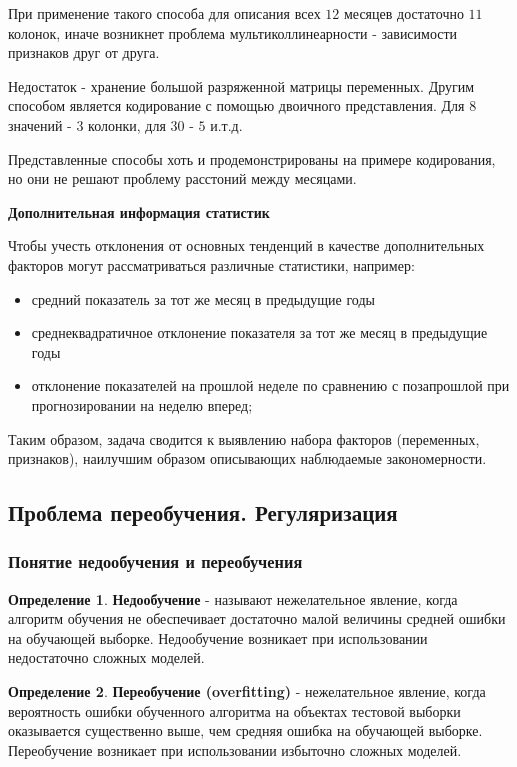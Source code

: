 \documentclass[aps,%
12pt,%
final,%
oneside,
onecolumn,%
musixtex, %
superscriptaddress,%
centertags]{article} %
\theoremstyle{plain}
\theoremstyle{definition}
\newtheorem{definition}{Определение}[subsection]
\theoremstyle{remark}
\begin{document}
При применение такого способа для описания всех $12$ месяцев достаточно $11$ колонок, иначе возникнет проблема мультиколлинеарности - зависимости признаков друг от друга.

Недостаток - хранение большой разряженной матрицы переменных. Другим способом является кодирование с помощью двоичного представления. Для $8$ значений - $3$ колонки, для $30$ - $5$ и.т.д.

Представленные способы хоть и продемонстрированы на примере кодирования, но они не решают проблему расстоний между месяцами.

\textbf{Дополнительная информация статистик}

Чтобы учесть отклонения от основных тенденций в качестве дополнительных факторов могут рассматриваться различные статистики, например:

\begin{itemize}
	\item средний показатель за тот же месяц в предыдущие годы
	\item среднеквадратичное отклонение показателя за тот же месяц в предыдущие годы
	\item отклонение показателей на прошлой неделе по сравнению с позапрошлой при прогнозировании на неделю вперед;
\end{itemize}

Таким образом, задача сводится к выявлению набора факторов (переменных,
признаков), наилучшим образом описывающих наблюдаемые закономерности.

\newpage
\subsection{Проблема переобучения. Регуляризация}

\subsubsection{Понятие недообучения и переобучения}

\begin{definition}
	\textbf{Недообучение} - называют нежелательное явление, когда алгоритм обучения не
обеспечивает достаточно малой величины средней ошибки на обучающей выборке.
Недообучение возникает при использовании недостаточно сложных моделей.
\end{definition}

\begin{definition}
	\textbf{Переобучение (overfitting)} - нежелательное явление, когда вероятность ошибки обученного алгоритма на объектах тестовой выборки оказывается существенно выше, чем средняя ошибка на обучающей выборке. Переобучение возникает при использовании избыточно сложных моделей.
\end{definition}
\end{document}
